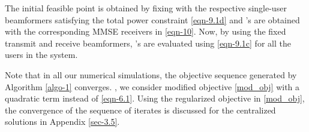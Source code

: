 The initial feasible point  is obtained by fixing  with the respective single-user beamformers satisfying the total power constraint \eqref{eqn-9.1d} and 's are obtained with the corresponding \ac{MMSE} receivers in \eqref{eqn-10}. Now, by using the fixed transmit and receive beamformers, 's are evaluated using \eqref{eqn-9.1c} for all the users in the system. 

Note that in all our numerical simulations, the objective sequence generated by Algorithm \ref{algo-1} converges. , we consider modified objective \eqref{mod_obj} with a quadratic term instead of \eqref{eqn-6.1}. Using the regularized objective in \eqref{mod_obj}, the convergence of the sequence of iterates is discussed for the centralized solutions in Appendix \ref{sec-3.5}.
